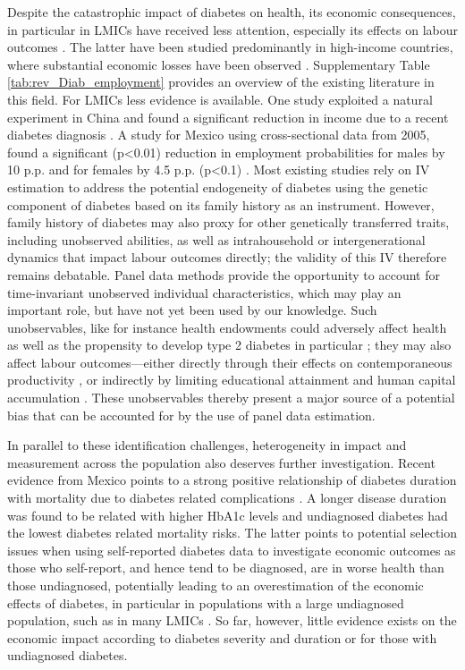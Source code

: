 \documentclass[10pt,letterpaper]{article}
\begin{document}
Despite the catastrophic impact of diabetes on health, its economic consequences, in particular in \acp{LMIC} have received less attention, especially its effects on labour outcomes \cite{Seuring2015a}. The latter have been studied predominantly in high-income countries, where substantial economic losses have been observed \cite{Brown2005,Brown2014,BrownIII2011,Minor2011,Minor2013,Minor2015,Latif2009}. Supplementary Table \ref{tab:rev_Diab_employment} provides an overview of the existing literature in this field. For \acp{LMIC} less evidence is available. One study exploited a natural experiment in China and found a significant reduction in income due to a recent diabetes diagnosis \cite{Liu2014}. A study for Mexico using cross-sectional data from 2005, found a significant (p<0.01) reduction in employment probabilities for males by 10 \ac{p.p.} and for females by 4.5 \ac{p.p.} (p<0.1) \cite{Seuring2015}. Most existing studies rely on \ac{IV} estimation to address the potential endogeneity of diabetes using the genetic component of diabetes based on its family history as an instrument.  However, family history of diabetes may also proxy for other genetically transferred traits, including unobserved abilities, as well as  intrahousehold or intergenerational dynamics that impact labour outcomes directly; the validity of this \ac{IV} therefore remains debatable. Panel data methods provide the opportunity to account for time-invariant unobserved individual characteristics, which may play an important role, but have not yet been used by our knowledge. Such unobservables, like for instance health endowments could adversely affect health as well as the propensity to develop type 2 diabetes in particular \cite{VanEwijk2011,Sotomayor2013,Li2010b}; they may also affect labour outcomes---either directly through their effects on contemporaneous productivity \cite{Currie2013}, or indirectly by limiting educational attainment and human capital accumulation \cite{Ayyagari2011a}. These unobservables thereby present a major source of a potential bias that can be accounted for by the use of panel data estimation.

In parallel to these identification challenges, heterogeneity in impact and measurement across the population also deserves further investigation. Recent evidence from Mexico points to a strong positive relationship of diabetes duration with mortality due to diabetes related complications \cite{Herrington2018}. A longer disease duration was found to be related with higher \ac{HbA1c} levels and undiagnosed diabetes had the lowest diabetes related mortality risks. The latter points to potential selection issues when using self-reported diabetes data to investigate economic outcomes as those who self-report, and hence tend to be diagnosed, are in worse health than those undiagnosed, potentially leading to an overestimation of the economic effects of diabetes, in particular in populations with a large undiagnosed population, such as in many \acp{LMIC} \cite{Beagley2014}. So far, however, little evidence exists on the economic impact according to diabetes severity and duration or for those with undiagnosed diabetes. 
\end{document}

